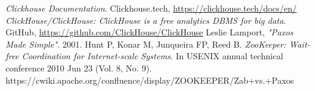 \documentclass[conference]{IEEEtran}
\begin{document}
\begin{thebibliography}{00}
\emph{Clickhouse Documentation}. Clickhouse.tech, \url{https://clickhouse.tech/docs/en/}
\emph{ClickHouse/ClickHouse: ClickHouse is a free analytics DBMS for big data}. GitHub, \url{https://github.com/ClickHouse/ClickHouse}
Leslie Lamport, \emph{"Paxos Made Simple"}. 2001.
Hunt P, Konar M, Junqueira FP, Reed B. \emph{ZooKeeper: Wait-free Coordination for Internet-scale Systems}. In USENIX annual technical conference 2010 Jun 23 (Vol. 8, No. 9).
https://cwiki.apache.org/confluence/display/ZOOKEEPER/Zab+vs.+Paxos
\end{thebibliography}
\end{document}
